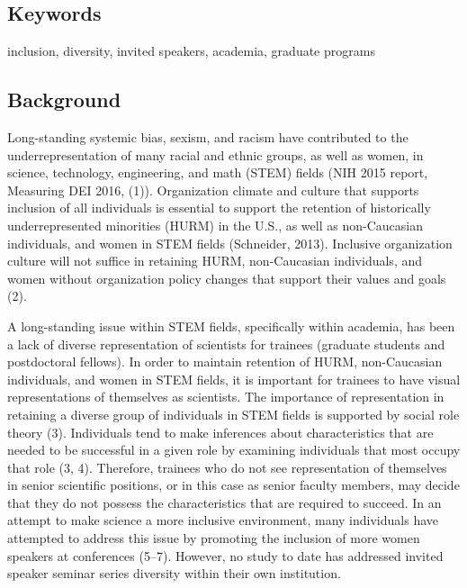 \documentclass[10pt,]{article}
\begin{document}
\subsection{Keywords}\label{keywords}

inclusion, diversity, invited speakers, academia, graduate programs

\newpage

\subsection{Background}\label{background}

Long-standing systemic bias, sexism, and racism have contributed to the
underrepresentation of many racial and ethnic groups, as well as women,
in science, technology, engineering, and math (STEM) fields (NIH 2015
report, Measuring DEI 2016, (1)). Organization climate and culture that
supports inclusion of all individuals is essential to support the
retention of historically underrepresented minorities (HURM) in the
U.S., as well as non-Caucasian individuals, and women in STEM fields
(Schneider, 2013). Inclusive organization culture will not suffice in
retaining HURM, non-Caucasian individuals, and women without
organization policy changes that support their values and goals (2).

A long-standing issue within STEM fields, specifically within academia,
has been a lack of diverse representation of scientists for trainees
(graduate students and postdoctoral fellows). In order to maintain
retention of HURM, non-Caucasian individuals, and women in STEM fields,
it is important for trainees to have visual representations of
themselves as scientists. The importance of representation in retaining
a diverse group of individuals in STEM fields is supported by social
role theory (3). Individuals tend to make inferences about
characteristics that are needed to be successful in a given role by
examining individuals that most occupy that role (3, 4). Therefore,
trainees who do not see representation of themselves in senior
scientific positions, or in this case as senior faculty members, may
decide that they do not possess the characteristics that are required to
succeed. In an attempt to make science a more inclusive environment,
many individuals have attempted to address this issue by promoting the
inclusion of more women speakers at conferences (5--7). However, no
study to date has addressed invited speaker seminar series diversity
within their own institution.
\end{document}
